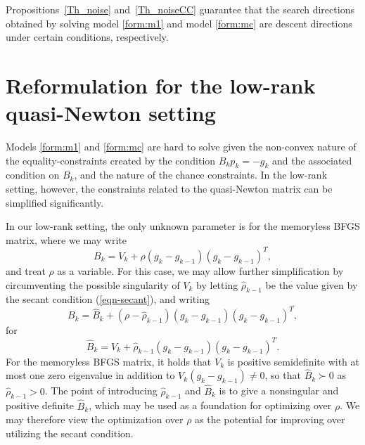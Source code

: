 \documentclass[11pt,twoside]{article}
\begin{document}

Propositions~\ref{Th_noise} and~\ref{Th_noiseCC} guarantee that the search directions obtained by solving model \eqref{form:m1} and model \eqref{form:mc} are descent directions under certain conditions, respectively.


\section{Reformulation for the low-rank quasi-Newton setting}\label{sec-sto}

Models \eqref{form:m1} and \eqref{form:mc} are hard to solve given the
non-convex nature of the equality-constraints created by the condition
$B_k p_k=-g_k$ and the associated condition on $B_k$, and the nature
of the chance constraints. In the low-rank setting, however, the
constraints related to the quasi-Newton matrix can be simplified significantly.

In our low-rank setting, the only unknown parameter is for the
memoryless BFGS matrix, where we may write
\[
 B_k = V_k +  \rho (g_k-g_{k-1})(g_k-g_{k-1})^T,
\]
and treat $\rho$ as a variable. For this case, we may allow further
simplification by circumventing the possible singularity of $V_k$ by
letting $\hat\rho_{k-1}$ be the value given by the secant condition
(\ref{eqn-secant}), and writing
\begin{equation}\label{eqn-Bk}
B_k  = \hat B_k + (\rho-\hat\rho_{k-1})  ( g_k - g_{k-1} ) ( g_k - g_{k-1})^T,
\end{equation}
for
\begin{equation}\label{eqn-barBk}
\hat B_k = V_k +  \hat\rho_{k-1} ( g_k - g_{k-1} ) ( g_k - g_{k-1} )^T.
\end{equation}
For the memoryless BFGS matrix, it holds that $V_k$ is positive
semidefinite with at most one zero eigenvalue in addition to $V_k
(g_k-g_{k-1})\ne 0$, so that $\hat B_k \succ 0$ as $\hat\rho_{k-1} >
0$. The point of introducing $\hat\rho_{k-1}$ and $\hat B_k$ is to give a
nonsingular and positive definite $\hat B_k$, which may be used as a
foundation for optimizing over $\rho$. We may therefore view the
optimization over $\rho$ as the potential for improving over utilizing
the secant condition.
\end{document}
